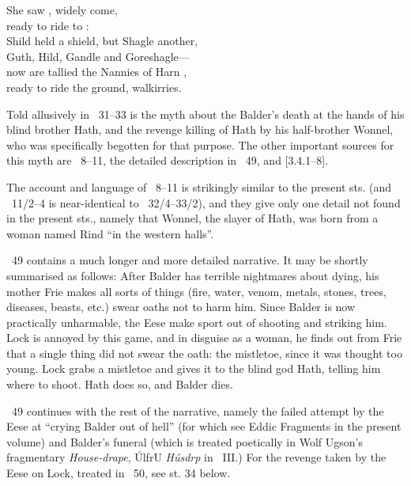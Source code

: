 \bvb She saw , widely come, \\
ready to ride to : \\
Shild held a shield, but Shagle another, \\
Guth, Hild, Gandle and Goreshagle— \\
now are tallied the Nannies of Harn , \\
ready to ride the ground, walkirries.\evb\evg

\sectionline

{\small Told allusively in \Voluspa\ 31–33 is the myth about the Balder’s death at the hands of his blind brother Hath, and the revenge killing of Hath by his half-brother Wonnel, who was specifically begotten for that purpose.  The other important sources for this myth are \Baldrsdraumar\ 8–11, the detailed description in \Gylfaginning\ 49, and \textcite{Saxo}[3.4.1–8].

The account and language of \Baldrsdraumar\ 8–11 is strikingly similar to the present sts. (and \Baldrsdraumar\ 11/2–4 is near-identical to \Voluspa\ 32/4–33/2), and they give only one detail not found in the present sts., namely that Wonnel, the slayer of Hath, was born from a woman named Rind “in the western halls”.

\Gylfaginning\ 49 contains a much longer and more detailed narrative.  It may be shortly summarised as follows: After Balder has terrible nightmares about dying, his mother Frie makes all sorts of things (fire, water, venom, metals, stones, trees, diseases, beasts, etc.) swear oaths not to harm him.  Since Balder is now practically unharmable, the Eese make sport out of shooting and striking him.  Lock is annoyed by this game, and in disguise as a woman, he finds out from Frie that a single thing did not swear the oath: the mistletoe, since it was thought too young.  Lock grabs a mistletoe and gives it to the blind god Hath, telling him where to shoot.  Hath does so, and Balder dies.

\Gylfaginning\ 49 continues with the rest of the narrative, namely the failed attempt by the Eese at “crying Balder out of hell” (for which see Eddic Fragments in the present volume) and Balder’s funeral (which is treated poetically in Wolf Ugson’s fragmentary \emph{House-drape}, ÚlfrU \emph{Húsdrp} in \Skp\ III.)  For the revenge taken by the Eese on Lock, treated in \Gylfaginning\ 50, see st. 34 below.

}
